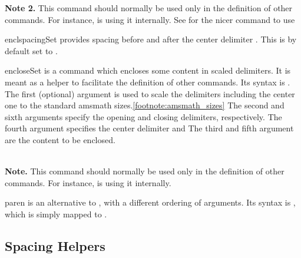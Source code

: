 \documentclass[english,a4paper,DIV=12,parskip=full,oneside]{scrartcl}
\begin{document}
\begin{commandlist}
            \textbf{Note 2.} This command should normally be used only in the definition of other commands.
            For instance, \codeCommand{\abs} is using it internally. See \codeCommand{\paren} for the nicer command to use
        \item[enclspacingSet] provides spacing before and after the center delimiter \codeCommand{\encloseSet}.
            This is by default set to \codeCommand{\,}.
        \item[encloseSet] is a command which encloses some content in scaled delimiters.
            It is meant as a helper to facilitate the definition of other commands.
            Its syntax is \codeCommand{\encloseSet#1]{#2}{#3}{#4}{#5}{#6}}.
            The first (optional) argument is used to scale the delimiters including the center one to the standard amsmath sizes.\cref{footnote:amsmath_sizes}
            The second and sixth arguments specify the opening and closing delimiters, respectively.
        The fourth argument specifies the center delimiter and
            The third and fifth argument are the content to be enclosed.
            \par{} %
            \par{} %
            \\
            \textbf{Note.} This command should normally be used only in the definition of other commands.
            For instance, \codeCommand{\setDef} is using it internally.
        \item[paren] is an alternative to \codeCommand{\enclose}, with a different ordering of arguments.
            Its syntax is , which is simply mapped to .
            \par{}
            \par{}
            \par{}
    \end{commandlist}

    \subsection{Spacing Helpers}\label{subsec:spacing_helpers}
\end{document}
